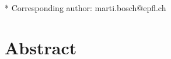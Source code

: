 \documentclass[10pt,letterpaper]{article}
\begin{document}
\vspace*{0.35in}



\begin{flushleft}
{\Large
\textbf\newline{}
}
\newline
\\
\bigskip
* Corresponding author: marti.bosch@epfl.ch

\end{flushleft}

\section*{Abstract}



\end{document}
